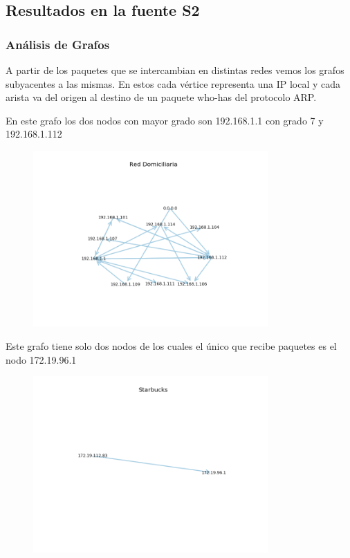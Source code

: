 \subsection{Resultados en la fuente S2}

\subsubsection{Análisis de Grafos}

A partir de los paquetes que se intercambian en distintas redes vemos los grafos subyacentes a las mismas. En estos cada vértice representa una IP local y cada arista va del origen al destino de un paquete who-has del protocolo ARP.


En este grafo los dos nodos con mayor grado son 192.168.1.1 con grado 7 y 192.168.1.112

\begin{figure}[H]
 \centering
	\includegraphics[width=0.8\textwidth]{figs/red_domiciliaria.png}
	\caption{}
	\label{fig:starbucks-grafo}
\end{figure}


Este grafo tiene solo dos nodos de los cuales el único que recibe paquetes es el nodo 172.19.96.1

\begin{figure}[H]
 \centering
	\includegraphics[width=0.8\textwidth]{figs/starbucks.png}
	\caption{}
	\label{fig:domicilio-grafo}
\end{figure}


